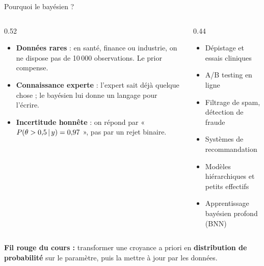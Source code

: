 \begin{frame}{Pourquoi le bayésien ?}
\begin{columns}[t]
\begin{column}{0.52\textwidth}
\begin{ebox}
\begin{itemize}
  \item \textbf{Données rares} : en santé, finance ou industrie, on ne dispose
        pas de 10\,000 observations. Le prior compense.
  \item \textbf{Connaissance experte} : l'expert sait déjà quelque chose ;
        le bayésien lui donne un langage pour l'écrire.
  \item \textbf{Incertitude honnête} : on répond par
        « $P(\theta > 0{,}5 \,\vert\, y) = 0{,}97$ », pas par un rejet binaire.
\end{itemize}
\end{ebox}
\end{column}
\begin{column}{0.44\textwidth}
\begin{kbox}
\begin{itemize}
  \item Dépistage et essais cliniques
  \item A/B testing en ligne
  \item Filtrage de spam, détection de fraude
  \item Systèmes de recommandation
  \item Modèles hiérarchiques et petits effectifs
  \item Apprentissage bayésien profond (BNN)
\end{itemize}
\end{kbox}
\end{column}
\end{columns}
\vspace{1mm}
\centering
\begin{tcolorbox}[colback=byCyan!8,colframe=byCyan,width=.94\textwidth,arc=2mm]
\centering\small
\textbf{Fil rouge du cours :} transformer une croyance a priori en
\textbf{distribution de probabilité} sur le paramètre, puis la mettre à jour par les données.
\end{tcolorbox}
\end{frame}

